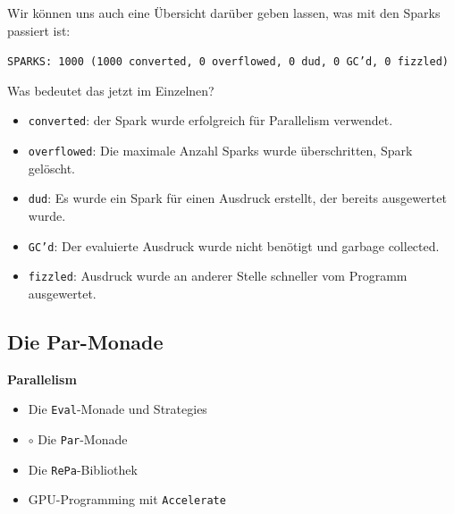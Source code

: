 \documentclass{beamer}
\begin{document}
\begin{frame}
Wir können uns auch eine Übersicht darüber geben lassen, was mit den Sparks passiert ist:

\scriptsize
\texttt{SPARKS: 1000 (1000 converted, 0 overflowed, 0 dud, 0 GC'd, 0 fizzled)}
\normalsize\bigskip
\pause

Was bedeutet das jetzt im Einzelnen?\pause
\begin{itemize}
\item \texttt{converted}: der Spark wurde erfolgreich für Parallelism verwendet.\pause
\item \texttt{overflowed}: Die maximale Anzahl Sparks wurde überschritten, Spark gelöscht.\pause
\item \texttt{dud}: Es wurde ein Spark für einen Ausdruck erstellt, der bereits ausgewertet wurde.\pause
\item \texttt{GC'd}: Der evaluierte Ausdruck wurde nicht benötigt und garbage collected.\pause
\item \texttt{fizzled}: Ausdruck wurde an anderer Stelle schneller vom Programm ausgewertet.
\end{itemize}

\end{frame}


\subsection{Die Par-Monade}

\begin{frame}[fragile]

\begin{center}
\Large
\textbf{Parallelism}\normalsize\bigskip
\begin{itemize}
\item Die \texttt{Eval}-Monade und Strategies
\item $\circ$ Die \texttt{Par}-Monade
\item Die \texttt{RePa}-Bibliothek
\item GPU-Programming mit \texttt{Accelerate}
\end{itemize}
\end{center}

\end{frame}

\end{document}
